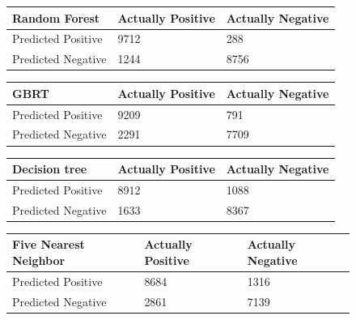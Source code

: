 \documentclass[ %
                    author={Sam Phippen},
                supervisor={Dr. Rafal Bogacz},
                     title={Real time voice activity detectors in noisy personal computing environments},
                  subtitle={},
                    degree={MEng},
                      year={2012} ]{thesis}
\begin{document}
\begin{figure}
    \label{fig:multiclass-confusion}

    \begin{tabular}{|l||l|l|}
        \hline
        Random Forest      & Actually Positive & Actually Negative \\ \hline
        Predicted Positive & 9712              & 288               \\ \hline
        Predicted Negative & 1244              & 8756              \\ \hline
    \end{tabular}

    \vspace{0.75cm}

    \begin{tabular}{|l||l|l|}
        \hline
        GBRT               & Actually Positive & Actually Negative \\ \hline
        Predicted Positive & 9209              & 791               \\ \hline
        Predicted Negative & 2291              & 7709              \\ \hline
    \end{tabular}

    \vspace{0.75cm}

    \begin{tabular}{|l||l|l|}
        \hline
        Decision tree      & Actually Positive & Actually Negative \\ \hline
        Predicted Positive & 8912              & 1088               \\ \hline
        Predicted Negative & 1633              & 8367              \\ \hline
    \end{tabular}

    \vspace{0.75cm}

    \begin{tabular}{|l||l|l|}
        \hline
        Five Nearest Neighbor & Actually Positive & Actually Negative \\ \hline
        Predicted Positive    & 8684              & 1316               \\ \hline
        Predicted Negative    & 2861              & 7139              \\ \hline
    \end{tabular}

    \vspace{0.75cm}


\end{figure}
\end{document}
